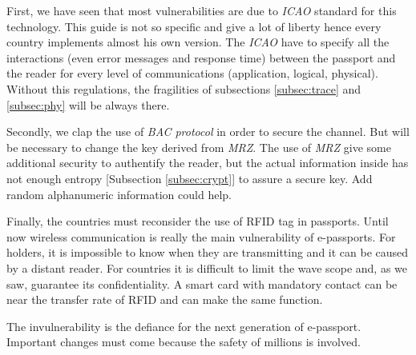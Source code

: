 \documentclass{acm_proc_article-sp}
\begin{document}
First, we have seen that most vulnerabilities are due to \emph{ICAO} standard for this technology. This guide is not so specific and give a lot of liberty hence every country implements almost his own version. The \emph{ICAO} have to specify all the interactions (even error messages and response time)  between the passport and the reader for every level of communications (application, logical, physical). Without this regulations, the fragilities of subsections \ref{subsec:trace} and \ref{subsec:phy} will be always there.

Secondly, we clap the use of \emph{BAC protocol} in order to secure the channel. But will be necessary to change the key derived from \emph{MRZ}. The use of \emph{MRZ} give some additional security to authentify the reader, but the actual information inside has not enough entropy [Subsection \ref{subsec:crypt}] to assure a secure key. Add random alphanumeric information could help.

Finally, the countries must reconsider the use of RFID tag in passports. Until now wireless communication is really the main vulnerability of e-passports. For holders, it is impossible to know when they are transmitting and it can be caused by a distant reader. For countries it is difficult to limit the wave scope and, as we saw, guarantee its confidentiality. A smart card with mandatory contact can be near the transfer rate of RFID and can make the same function.

The invulnerability is the defiance for the next generation of e-passport. Important changes must come because the safety of millions is involved. 


%
%

\balancecolumns
\end{document}

